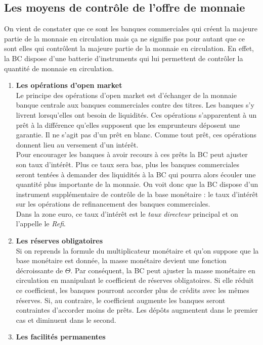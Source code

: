 \documentclass[10pt]{book}
\begin{document}
\subsection{Les moyens de contrôle de l'offre de monnaie}
On vient de constater que ce sont les banques commerciales qui créent la majeure partie de la monnaie en circulation mais ça ne signifie pas pour autant que ce sont elles qui contrôlent la majeure partie de la monnaie en circulation. En effet, la BC dispose d'une batterie d'instruments qui lui permettent de contrôler la quantité de monnaie en circulation. 
\begin{enumerate}
  \item \textbf{Les opérations d'open market} \\
    Le principe des opérations d'open market est d'échanger de la monnaie banque centrale aux banques commerciales contre des titres. Les banques s'y livrent lorsqu'elles ont besoin de liquidités. Ces opérations s'apparentent à un prêt à la différence qu'elles supposent que les emprunteurs déposent une garantie. Il ne s'agit pas d'un prêt en blanc. Comme tout prêt, ces opérations donnent lieu au versement d'un intérêt. \\
    Pour encourager les banques à avoir recours à ces prêts la BC peut ajuster son taux d'intérêt. Plus ce taux sera bas, plus les banques commerciales seront tentées à demander des liquidités à la BC qui pourra alors écouler une quantité plus importante de la monnaie. On voit donc que la BC dispose d'un instrument supplémentaire de contrôle de la base monétaire : le taux d'intérêt sur les opérations de refinancement des banques commerciales. \\
    Dans la zone euro, ce taux d'intérêt est le \textit{taux directeur} principal et on l'appelle le \textit{Refi}.
  \item \textbf{Les réserves obligatoires} \\
    Si on reprends la formule du multiplicateur monétaire et qu'on suppose que la base monétaire est donnée, la masse monétaire devient une fonction décroissante de $\Theta$. Par conséquent, la BC peut ajuster la masse monétaire en circulation en manipulant le coefficient de réserves obligatoires. Si elle réduit ce coefficient, les banques pourront accorder plus de crédits avec les mêmes réserves. Si, au contraire, le coefficient augmente les banques seront contraintes d'accorder moins de prêts. Les dépôts augmentent dans le premier cas et diminuent dans le second. \\
  \item \textbf{Les facilités permanentes} \\

\end{enumerate}
\end{document}
